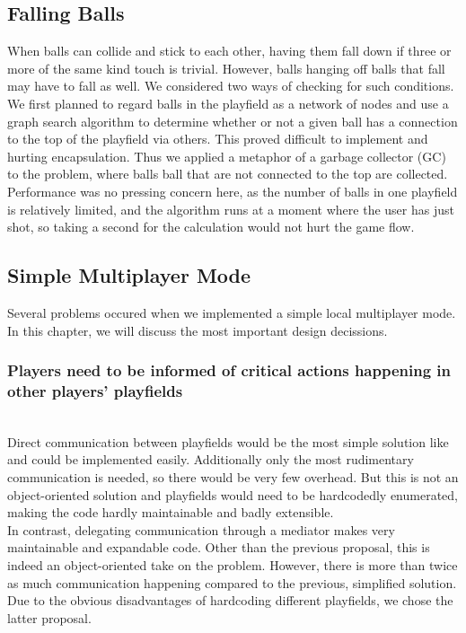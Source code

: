 \subsection{Falling Balls}
\label{sec:garbage}
When balls can collide and stick to each other, having them fall down 
if three or more of the same kind touch is trivial. However, balls 
hanging off balls that fall may have to fall as well. We considered 
two ways of checking for such conditions. We first planned to regard balls in the 
playfield as a network of nodes and use a graph search algorithm to determine 
whether or not a given ball has a connection to the top of the playfield via 
others. This proved difficult to implement and hurting encapsulation. Thus 
we applied a metaphor of a garbage collector (GC) to the problem, where balls
ball that are not connected to the top are collected. Performance was no pressing 
concern here, as the number of balls in one playfield is relatively limited, 
and the algorithm runs at a moment where the user has just shot, so taking a second 
for the calculation would not hurt the game flow.

\subsection{Simple Multiplayer Mode}
Several problems occured when we implemented a simple local multiplayer mode. In this chapter, 
we will discuss the most important design decissions.

%
  \subsubsection{Players need to be informed of critical actions happening in other players' playfields}
  ~\\
    Direct communication between playfields would be the most simple solution like and 
    could be implemented easily. Additionally only the most rudimentary communication is needed,
    so there would be very few overhead. But this is not an object-oriented solution and playfields 
    would need to be hardcodedly enumerated, making the code hardly maintainable and badly extensible.\\
    In contrast, delegating communication through a mediator makes very maintainable and
    expandable code. Other than the previous proposal, this is indeed an object-oriented 
    take on the problem. However, there is more than twice as much communication happening 
    compared to the previous, simplified solution. Due to the obvious disadvantages of 
    hardcoding different playfields, we chose the latter proposal.

